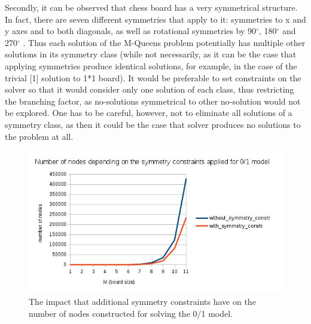 \documentclass{report}
\begin{document}
Secondly, it can be observed that chess board has a very symmetrical structure. In fact, there are seven different symmetries that apply to it: symmetries to x and y axes and to both diagonals, as well as rotational symmetries by 90$^{\circ}$, 180$^{\circ}$ and 270$^{\circ}$ \cite{SPG}. Thus each solution of the M-Queens problem potentially has multiple other solutions in its symmetry class (while not necessarily, as it can be the case that applying symmetries produce identical solutions, for example, in the case of the trivial [1] solution to 1*1 board). It would be preferable to set constraints on the solver so that it would consider only one solution of each class, thus restricting the branching factor, as no-solutions symmetrical to other no-solution would not be explored. One has to be careful, however, not to eliminate all solutions of a symmetry class, as then it could be the case that solver produces no solutions to the problem at all.

\begin{figure} [\textwidth]
\includegraphics[scale=0.6]{images/p1_sym.jpg}
\caption{The impact that additional symmetry constraints have on the number of nodes constructed for solving the 0/1 model.}
\end{figure}
\end{document}
